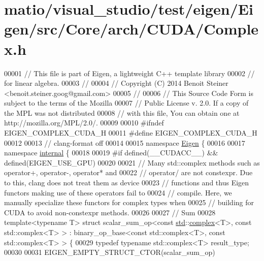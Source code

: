 \hypertarget{matio_2visual__studio_2test_2eigen_2_eigen_2src_2_core_2arch_2_c_u_d_a_2_complex_8h_source}{}\section{matio/visual\+\_\+studio/test/eigen/\+Eigen/src/\+Core/arch/\+C\+U\+D\+A/\+Complex.h}
\label{matio_2visual__studio_2test_2eigen_2_eigen_2src_2_core_2arch_2_c_u_d_a_2_complex_8h_source}

\begin{DoxyCode}
00001 \textcolor{comment}{// This file is part of Eigen, a lightweight C++ template library}
00002 \textcolor{comment}{// for linear algebra.}
00003 \textcolor{comment}{//}
00004 \textcolor{comment}{// Copyright (C) 2014 Benoit Steiner <benoit.steiner.goog@gmail.com>}
00005 \textcolor{comment}{//}
00006 \textcolor{comment}{// This Source Code Form is subject to the terms of the Mozilla}
00007 \textcolor{comment}{// Public License v. 2.0. If a copy of the MPL was not distributed}
00008 \textcolor{comment}{// with this file, You can obtain one at http://mozilla.org/MPL/2.0/.}
00009 
00010 \textcolor{preprocessor}{#ifndef EIGEN\_COMPLEX\_CUDA\_H}
00011 \textcolor{preprocessor}{#define EIGEN\_COMPLEX\_CUDA\_H}
00012 
00013 \textcolor{comment}{// clang-format off}
00014 
00015 \textcolor{keyword}{namespace }\hyperlink{namespace_eigen}{Eigen} \{
00016 
00017 \textcolor{keyword}{namespace }\hyperlink{namespaceinternal}{internal} \{
00018 
00019 \textcolor{preprocessor}{#if defined(\_\_CUDACC\_\_) && defined(EIGEN\_USE\_GPU)}
00020 
00021 \textcolor{comment}{// Many std::complex methods such as operator+, operator-, operator* and}
00022 \textcolor{comment}{// operator/ are not constexpr. Due to this, clang does not treat them as device}
00023 \textcolor{comment}{// functions and thus Eigen functors making use of these operators fail to}
00024 \textcolor{comment}{// compile. Here, we manually specialize these functors for complex types when}
00025 \textcolor{comment}{// building for CUDA to avoid non-constexpr methods.}
00026 
00027 \textcolor{comment}{// Sum}
00028 \textcolor{keyword}{template}<\textcolor{keyword}{typename} T> \textcolor{keyword}{struct }scalar\_sum\_op<const \hyperlink{namespacestd}{std}::\hyperlink{structcomplex}{complex}<T>, const std::complex<T> > : 
      binary\_op\_base<const std::complex<T>, const std::complex<T> > \{
00029   \textcolor{keyword}{typedef} \textcolor{keyword}{typename} std::complex<T> result\_type;
00030 
00031   EIGEN\_EMPTY\_STRUCT\_CTOR(scalar\_sum\_op)

\end{DoxyCode}
